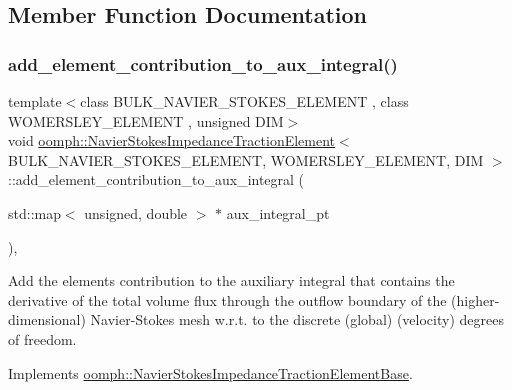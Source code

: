 \subsection{Member Function Documentation}
\mbox{\label{classoomph_1_1NavierStokesImpedanceTractionElement_addae9a132e1004423ce501f71a84fe07}} 
\subsubsection{\texorpdfstring{add\+\_\+element\+\_\+contribution\+\_\+to\+\_\+aux\+\_\+integral()}{add\_element\_contribution\_to\_aux\_integral()}}
{\footnotesize\ttfamily template$<$class B\+U\+L\+K\+\_\+\+N\+A\+V\+I\+E\+R\+\_\+\+S\+T\+O\+K\+E\+S\+\_\+\+E\+L\+E\+M\+E\+NT , class W\+O\+M\+E\+R\+S\+L\+E\+Y\+\_\+\+E\+L\+E\+M\+E\+NT , unsigned D\+IM$>$ \\
void \hyperlink{classoomph_1_1NavierStokesImpedanceTractionElement}{oomph\+::\+Navier\+Stokes\+Impedance\+Traction\+Element}$<$ B\+U\+L\+K\+\_\+\+N\+A\+V\+I\+E\+R\+\_\+\+S\+T\+O\+K\+E\+S\+\_\+\+E\+L\+E\+M\+E\+NT, W\+O\+M\+E\+R\+S\+L\+E\+Y\+\_\+\+E\+L\+E\+M\+E\+NT, D\+IM $>$\+::add\+\_\+element\+\_\+contribution\+\_\+to\+\_\+aux\+\_\+integral (\begin{DoxyParamCaption}\item[{std\+::map$<$ unsigned, double $>$ $\ast$}]{aux\+\_\+integral\+\_\+pt }\end{DoxyParamCaption})\hspace{0.3cm}{\ttfamily [inline]}, {\ttfamily [virtual]}}

Add the element\textquotesingle{}s contribution to the auxiliary integral that contains the derivative of the total volume flux through the outflow boundary of the (higher-\/dimensional) Navier-\/\+Stokes mesh w.\+r.\+t. to the discrete (global) (velocity) degrees of freedom. 

Implements \hyperlink{classoomph_1_1NavierStokesImpedanceTractionElementBase_a4ce2150b59ff999c24e623b645f1c899}{oomph\+::\+Navier\+Stokes\+Impedance\+Traction\+Element\+Base}.



